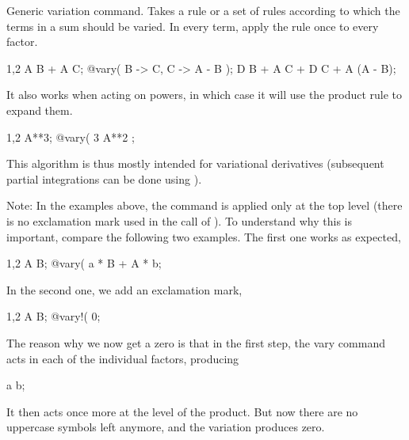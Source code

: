 
Generic variation command.  Takes a rule or a set of rules
according to which the terms in a sum should be varied. In every term,
apply the rule once to every factor.
\begin{screen}{1,2}
A B + A C;
@vary(%
          B -> \epsilon C,
          C -> \epsilon A - \epsilon B );
\epsilon D B + A \epsilon C + \epsilon D C 
                   + A (\epsilon A - \epsilon B);
\end{screen}
It also works when acting on powers, in which case it will use the
product rule to expand them.
\begin{screen}{1,2}
A**3;
@vary(%
3 A**{2} ;
\end{screen}
This algorithm is thus mostly intended for variational derivatives
(subsequent partial integrations can be done
using ). 

Note: In the examples above, the command is applied only at the top
level (there is no exclamation mark used in the call
of ). To understand why this is important, compare
the following two examples. The first one works as expected,
\begin{screen}{1,2}
A B;
@vary(%
a * B + A * b;
\end{screen}
In the second one, we add an exclamation mark,
\begin{screen}{1,2}
A B;
@vary!(%
0;
\end{screen}
The reason why we now get a zero is that in the first step, the vary
command acts in each of the individual factors, producing
\begin{screen}{0}
a b;
\end{screen}
It then acts once more at the level of the product. But now there are
no uppercase symbols left anymore, and the variation produces zero.


